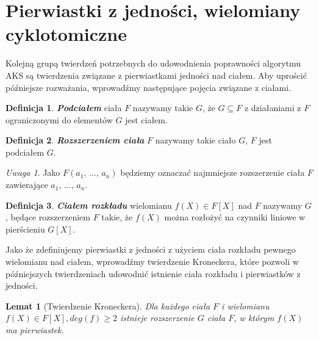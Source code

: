 \documentclass[polish,declaration,shortabstract]{iithesis}
\theoremstyle{definition}
\newtheorem{definition}{Definicja}
\theoremstyle{remark} \newtheorem{observation}{Obserwacja}
\theoremstyle{plain} \newtheorem{theorem}{Twierdzenie}
\theoremstyle{plain} \newtheorem{lemma}{Lemat}
\theoremstyle{remark} \newtheorem*{remark*}{Uwaga}
\theoremstyle{reminder} \newtheorem*{reminder*}{Przypomnienie}
\begin{document}
\section{Pierwiastki z jedności, wielomiany cyklotomiczne}

Kolejną grupą twierdzeń potrzebnych do udowodnienia poprawności algorytmu AKS są twierdzenia związane z pierwiastkami jedności nad ciałem. Aby uprościć późniejsze rozważania, wprowadźmy następujące pojęcia związane z ciałami.

\begin{definition}
	\textit{\textbf{Podciałem}} ciała $F$ nazywamy takie $G$, że $G \subseteq F$ z działaniami z $F$ ograniczonymi do elementów $G$ jest ciałem.
\end{definition}
	
\begin{definition}
	\textit{\textbf{Rozszerzeniem ciała}} $F$ nazywamy takie ciało $G$, $F$ jest podciałem $G$.
\end{definition}
	
\begin{remark*}
	Jako $F(a_1, \, \dots,\, a_n)$ będziemy oznaczać najmniejsze rozszerzenie ciała $F$ zawierające $a_1, \, \dots,\, a_n$.
\end{remark*}
	
\begin{definition}
	\textit{\textbf{Ciałem rozkładu}} wielomianu $f(X) \in F[X]$ nad $F$ nazywamy $G$, będące rozszerzeniem $F$ takie, że $f(X)$ można rozłożyć na czynniki liniowe w pierścieniu $G[X]$.
\end{definition}

Jako że zdefiniujemy pierwiastki z jedności z użyciem ciała rozkładu pewnego wielomianu nad ciałem, wprowadźmy twierdzenie Kroneckera, które pozwoli w późniejszych twierdzeniach udowodnić istnienie ciała rozkładu i pierwiastków z jedności.
	
\begin{lemma}[Twierdzenie Kroneckera] \label{Kronecker}
	Dla każdego ciała $F$ i wielomianu $f(X) \in F[X], deg(f) \geq 2$ istnieje rozszerzenie $G$ ciała $F$, w którym $f(X)$ ma pierwiastek.
\end{lemma}
	
\end{document}
